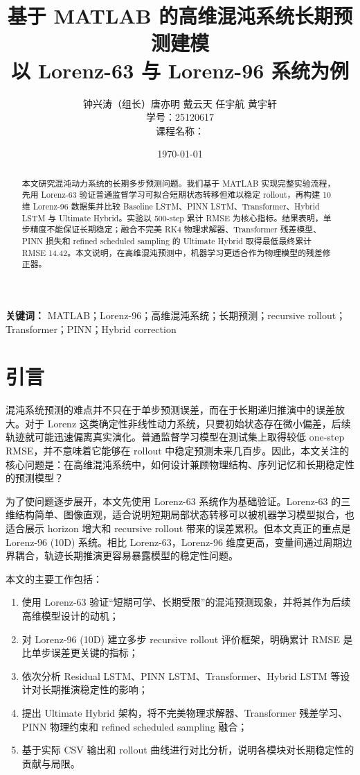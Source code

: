 \documentclass[UTF8,a4paper,12pt]{ctexart}
\title{\heiti 基于 MATLAB 的高维混沌系统长期预测建模\\
\large 以 Lorenz-63 与 Lorenz-96 系统为例}
\author{钟兴涛（组长）\quad 唐亦明 \quad 戴云天 \quad 任宇航 \quad 黄宇轩\\
学号：25120617 \quad 25120638 \quad 25120636 \quad 25120699 \quad 25120619\\
课程名称：\courseName}
\date{\today}
\begin{document}
\begin{abstract}
本文研究混沌动力系统的长期多步预测问题。我们基于 MATLAB 实现完整实验流程，先用 Lorenz-63 验证普通监督学习可拟合短期状态转移但难以稳定 rollout，再构建 10 维 Lorenz-96 数据集并比较 Baseline LSTM、PINN LSTM、Transformer、Hybrid LSTM 与 Ultimate Hybrid。实验以 500-step 累计 RMSE 为核心指标。结果表明，单步精度不能保证长期稳定；融合不完美 RK4 物理求解器、Transformer 残差模型、PINN 损失和 refined scheduled sampling 的 Ultimate Hybrid 取得最低最终累计 RMSE 14.42。本文说明，在高维混沌预测中，机器学习更适合作为物理模型的残差修正器。
\end{abstract}

\noindent\textbf{关键词：} MATLAB；Lorenz-96；高维混沌系统；长期预测；recursive rollout；Transformer；PINN；Hybrid correction

\newpage
\tableofcontents
\newpage

\section{引言}

混沌系统预测的难点并不只在于单步预测误差，而在于长期递归推演中的误差放大。对于 Lorenz 这类确定性非线性动力系统，只要初始状态存在微小偏差，后续轨迹就可能迅速偏离真实演化。普通监督学习模型在测试集上取得较低 one-step RMSE，并不意味着它能够在 rollout 中稳定预测未来几百步。因此，本文关注的核心问题是：在高维混沌系统中，如何设计兼顾物理结构、序列记忆和长期稳定性的预测模型？

为了使问题逐步展开，本文先使用 Lorenz-63 系统作为基础验证。Lorenz-63 的三维结构简单、图像直观，适合说明短期局部状态转移可以被机器学习模型拟合，也适合展示 horizon 增大和 recursive rollout 带来的误差累积。但本文真正的重点是 Lorenz-96 (10D) 系统。相比 Lorenz-63，Lorenz-96 维度更高，变量间通过周期边界耦合，轨迹长期推演更容易暴露模型的稳定性问题。

本文的主要工作包括：
\begin{enumerate}
    \item 使用 Lorenz-63 验证“短期可学、长期受限”的混沌预测现象，并将其作为后续高维模型设计的动机；
    \item 对 Lorenz-96 (10D) 建立多步 recursive rollout 评价框架，明确累计 RMSE 是比单步误差更关键的指标；
    \item 依次分析 Residual LSTM、PINN LSTM、Transformer、Hybrid LSTM 等设计对长期推演稳定性的影响；
    \item 提出 Ultimate Hybrid 架构，将不完美物理求解器、Transformer 残差学习、PINN 物理约束和 refined scheduled sampling 融合；
    \item 基于实际 CSV 输出和 rollout 曲线进行对比分析，说明各模块对长期稳定性的贡献与局限。
\end{enumerate}
\end{document}
